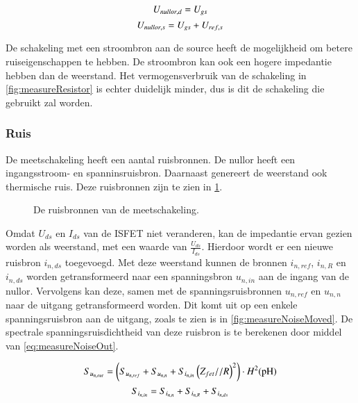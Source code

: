 \begin{equation}\label{eq:nullorVoltageDrain}
    U_{nullor,d} = U_{gs}
    \tagaddtext{[\si{\volt}]}
\end{equation}
\begin{equation}\label{eq:nullorVoltageSource}
    U_{nullor,s} = U_{gs} + U_{ref,s}
    \tagaddtext{[\si{\volt}]}
\end{equation}

De schakeling met een stroombron aan de source heeft de mogelijkheid om betere ruiseigenschappen te hebben. De stroombron kan ook een hogere impedantie hebben dan de weerstand. Het vermogensverbruik van de schakeling in \cref{fig:measureResistor} is echter duidelijk minder, dus is dit de schakeling die gebruikt zal worden.

\subsubsection{Ruis}

De meetschakeling heeft een aantal ruisbronnen. De nullor heeft een ingangsstroom- en spanninsruisbron. Daarnaast genereert de weerstand ook thermische ruis. Deze ruisbronnen zijn te zien in \cref{fig:measureNoise}.
\begin{figure}[!htbp]
    \centering
    \def\svgwidth{0.6\textwidth}
    
    \caption{De ruisbronnen van de meetschakeling.}
    \label{fig:measureNoise}
\end{figure}


Omdat $U_{ds}$ en $I_{ds}$ van de ISFET niet veranderen, kan de impedantie ervan gezien worden als weerstand, met een waarde van $\frac{U_{ds}}{I_{ds}}$. Hierdoor wordt er een nieuwe ruisbron $i_{n,ds}$ toegevoegd. Met deze weerstand kunnen de bronnen $i_{n,ref}$, $i_{n,R}$ en $i_{n,ds}$ worden getransformeerd naar een spanningsbron $u_{n,in}$ aan de ingang van de nullor.
Vervolgens kan deze, samen met de spanningsruisbronnen $u_{n,ref}$ en $u_{n,n}$ naar de uitgang getransformeerd worden. Dit komt uit op een enkele spanningsruisbron aan de uitgang, zoals te zien is in \cref{fig:measureNoiseMoved}. De spectrale spanningsruisdichtheid van deze ruisbron is te berekenen door middel van \cref{eq:measureNoiseOut}.

\begin{equation}\label{eq:measureNoiseOut}
    S_{u_{{n,out}}} = \left(S_{u_{{n,ref}}} + S_{u_{{n,n}}} + S_{i_{n,in}}\left(Z_{fet} // R\right)^2\right) \cdot H^2(\ph)
    \tagaddtext{[\si{\volt\squared\per\hertz}]}
\end{equation}
\begin{equation}
    S_{i_{{n,in}}} = S_{i_{{n,n}}} + S_{i_{{n,R}}} + S_{i_{{n,ds}}}
    \tagaddtext{[\si{\ampere\squared\per\hertz}]}
    \label{eq:measureNoiseCurrentIn}
\end{equation}



